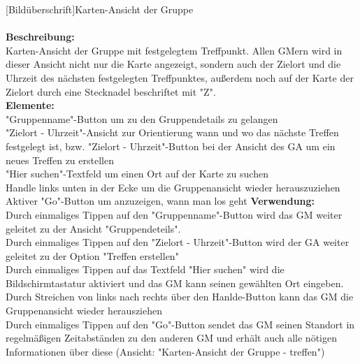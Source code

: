 [Bildüberschrift]Karten-Ansicht der Gruppe\\ \\
\textbf{Beschreibung:}\\
Karten-Ansicht der Gruppe mit festgelegtem Treffpunkt. Allen GMern wird in dieser Ansicht nicht nur die Karte angezeigt, sondern auch der Zielort und die Uhrzeit des nächsten festgelegten Treffpunktes, außerdem noch auf der Karte der Zielort durch eine Stecknadel beschriftet mit "Z".\\
\textbf{Elemente:}\\
"Gruppenname"-Button um zu den Gruppendetails zu gelangen\\
"Zielort - Uhrzeit"-Ansicht zur Orientierung wann und wo das nächste Treffen festgelegt ist, bzw. "Zielort - Uhrzeit"-Button bei der Ansicht des GA um ein neues Treffen zu erstellen\\
"Hier suchen"-Textfeld um einen Ort auf der Karte zu suchen\\
Handle links unten in der Ecke um die Gruppenansicht wieder herauszuziehen\\
Aktiver "Go"-Button um anzuzeigen, wann man los geht
\textbf{Verwendung:}\\
Durch einmaliges Tippen auf den "Gruppenname"-Button wird das GM weiter geleitet zu der Ansicht "Gruppendeteils".\\
Durch einmaliges Tippen auf den "Zielort - Uhrzeit"-Button wird der GA weiter geleitet zu der Option "Treffen erstellen"\\
Durch einmaliges Tippen auf das Textfeld "Hier suchen" wird die Bildschirmtastatur aktiviert und das GM kann seinen gewählten Ort eingeben.\\
Durch Streichen von links nach rechts über den Hanlde-Button kann das GM die Gruppenansicht wieder herausziehen\\
Durch einmaliges Tippen auf den "Go"-Button sendet das GM seinen Standort in regelmäßigen Zeitabständen zu den anderen GM und erhält auch alle nötigen Informationen über diese (Ansicht: "Karten-Ansicht der Gruppe - treffen")
\newpage

